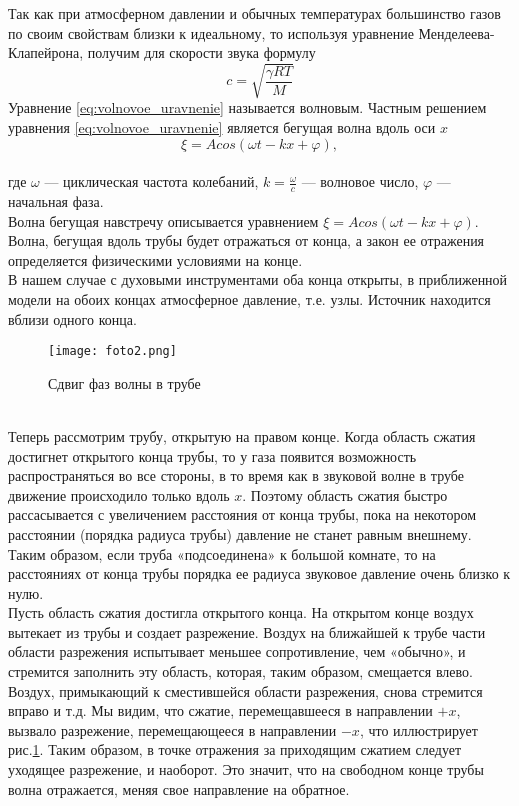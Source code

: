 Так как при атмосферном давлении и обычных температурах большинство газов по своим свойствам близки к идеальному, то используя уравнение Менделеева-Клапейрона, получим для скорости звука формулу
\begin{equation}
    c = \sqrt{\frac{\gamma R T}{M}}
\end{equation}
Уравнение \ref{eq:volnovoe_uravnenie}  называется волновым. Частным решением уравнения \ref{eq:volnovoe_uravnenie}  является бегущая волна вдоль оси $x$
\begin{equation}
    \xi = A cos(\omega t - kx + \varphi),
\end{equation}\\
где $\omega$ --- циклическая частота колебаний, $k = \frac{\omega}{c}$ --- волновое число, $\varphi$ --- начальная фаза.\\ 
Волна бегущая навстречу описывается уравнением $\xi = A cos(\omega t - kx + \varphi)$.\\
Волна, бегущая вдоль трубы будет отражаться от конца, а закон ее отражения определяется физическими условиями на конце.\\
В нашем случае с духовыми инструментами оба конца открыты, в приближенной модели на обоих концах атмосферное давление, т.е. узлы. Источник находится вблизи одного конца.\\
\begin{figure}[!ht]
    \centering
    \texttt{[image: foto2.png]}
    \caption{Сдвиг фаз волны в трубе}
    \label{fig:sdvig}
\end{figure}\\
Теперь рассмотрим трубу, открытую на правом конце. Когда область сжатия достигнет открытого конца трубы, то у газа появится возможность распространяться во все стороны, в то время как в звуковой волне в трубе движение происходило только вдоль $x$. Поэтому область сжатия быстро рассасывается с увеличением расстояния от конца трубы, пока на некотором расстоянии (порядка радиуса трубы) давление не станет равным внешнему. Таким образом, если труба «подсоединена» к большой комнате, то на расстояниях от конца трубы порядка ее радиуса звуковое давление очень близко к нулю.\\
Пусть область сжатия достигла открытого конца. На открытом конце воздух вытекает из трубы и создает разрежение. Воздух на ближайшей к трубе части области разрежения испытывает меньшее сопротивление, чем «обычно», и стремится заполнить эту область, которая, таким образом, смещается влево. Воздух, примыкающий к сместившейся области разрежения, снова стремится вправо и т.д. Мы видим, что сжатие, перемещавшееся в направлении $+x$, вызвало разрежение, перемещающееся в направлении $-x$, что иллюстрирует рис.\ref{fig:sdvig}. Таким образом, в точке отражения за приходящим сжатием следует уходящее разрежение, и наоборот. Это значит, что на свободном конце трубы волна отражается, меняя свое направление на обратное.\\

